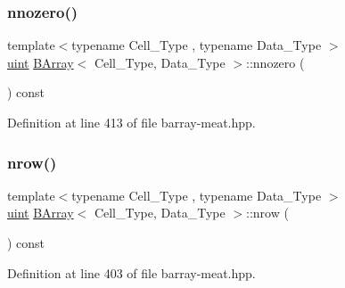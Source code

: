 \mbox{\label{class_b_array_a9910b6f42e37d3b0a12cafb70b78775f}} 
\subsubsection{\texorpdfstring{nnozero()}{nnozero()}}
{\footnotesize\ttfamily template$<$typename Cell\+\_\+\+Type , typename Data\+\_\+\+Type $>$ \\
\hyperlink{typedefs_8hpp_a91ad9478d81a7aaf2593e8d9c3d06a14}{uint} \hyperlink{class_b_array}{B\+Array}$<$ Cell\+\_\+\+Type, Data\+\_\+\+Type $>$\+::nnozero (\begin{DoxyParamCaption}{ }\end{DoxyParamCaption}) const\hspace{0.3cm}{\ttfamily [inline]}}



Definition at line 413 of file barray-\/meat.\+hpp.

\mbox{\label{class_b_array_ac829edf4a9921bd6b3f56afbcbb2f37f}} 
\subsubsection{\texorpdfstring{nrow()}{nrow()}}
{\footnotesize\ttfamily template$<$typename Cell\+\_\+\+Type , typename Data\+\_\+\+Type $>$ \\
\hyperlink{typedefs_8hpp_a91ad9478d81a7aaf2593e8d9c3d06a14}{uint} \hyperlink{class_b_array}{B\+Array}$<$ Cell\+\_\+\+Type, Data\+\_\+\+Type $>$\+::nrow (\begin{DoxyParamCaption}{ }\end{DoxyParamCaption}) const\hspace{0.3cm}{\ttfamily [inline]}}



Definition at line 403 of file barray-\/meat.\+hpp.

\mbox{\label{class_b_array_a8ddd0f172972420dce2cfce014126dba}} 
